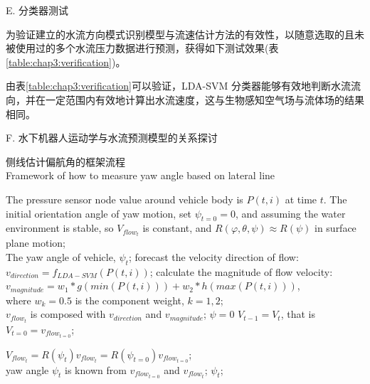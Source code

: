 E. {分类器测试 }

为验证建立的水流方向模式识别模型与流速估计方法的有效性，以随意选取的且未被使用过的多个水流压力数据进行预测，获得如下测试效果(表\ref{table:chap3:verification})。

由表\ref{table:chap3:verification}可以验证，LDA-SVM 分类器能够有效地判断水流流向，并在一定范围内有效地计算出水流速度，这与生物感知空气场与流体场的结果相同。

F. {水下机器人运动学与水流预测模型的关系探讨   }

\begin{algorithm}[!htbp]
\centering
\caption{侧线估计偏航角的框架流程 \protect \\\quad \quad Framework of how to measure yaw angle based on lateral line}
\label{Algorithm:chap3:Framwork}
\begin{algorithmic}[1]
\REQUIRE
The pressure sensor node value around vehicle body is $P \left (t,i \right )$ at time $t$. The initial orientation angle of yaw motion, set $\psi_{t=0} =0$, and assuming the water environment is stable, so $V_{flow_{t}}$ is constant, and $R\left (\varphi,\theta,\psi  \right )\approx R\left ( \psi \right )$ in surface plane motion;\\

\ENSURE
The yaw angle of vehicle, $\psi_t$;
    \STATE forecast the velocity direction of flow: \\
    $ v_{direction} = f_{LDA-SVM}\left ( P \left (t,i \right ) \right )$;
    \STATE calculate the magnitude of flow velocity: \\
    $v_{magnitude} = w_1\ast g\left(min\left( P \left (t,i \right ) \right)\right)
    + w_2 \ast  h\left(max\left(    P \left (t,i \right )    \right)\right)   $, \\where $w_k =0.5$  is the component weight, $k = 1,2$;\\

    \STATE ${v_{flow_t}}$ is composed with $ v_{direction}$ and $v_{magnitude}$;
        \STATE $ \psi = 0 $
        \STATE $ V_{t-1} = V_t $,
        that is $V_{t=0} = v_{flow_{t=0}}$;
    \ENDIF

    \STATE ${V_{flow_t}}= R\left( \psi_t \right){v_{flow_t}}
    = R\left( \psi_{t=0} \right){v_{flow_{t=0}}}$;\\
    \STATE yaw angle $\psi_t$ is known from $v_{flow_{t=0}}$ and $v_{flow_t}$;
\ENDFOR
\RETURN
 $\psi_t$;
\end{algorithmic}
\end{algorithm}


